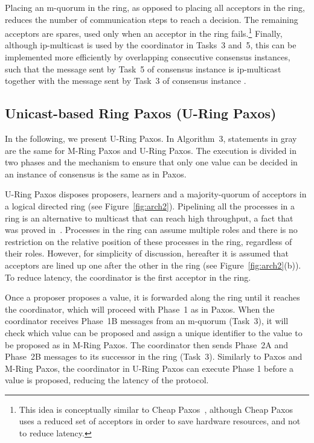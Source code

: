 \documentclass[final,3p,times,twocolumn,authoryear]{elsarticle}
\begin{document}
Placing an m-quorum in the ring, as opposed to placing all acceptors in the ring, reduces the number of communication steps to reach a decision. The remaining acceptors are spares, used only when an acceptor in the ring fails.\footnote{This idea is conceptually similar to Cheap Paxos~\cite{LM04}, although Cheap Paxos uses a reduced set of acceptors in order to save hardware resources, and not to reduce latency.} Finally, although ip-multicast is used by the coordinator in Tasks~3 and~5, this can be implemented more efficiently by overlapping consecutive consensus instances, such that the message sent by Task~5 of consensus instance  is ip-multicast together with the message sent by Task~3 of consensus instance .



\subsection{Unicast-based Ring Paxos (U-Ring Paxos)}
\label{sec:unirpaxos}

In the following, we present U-Ring Paxos. In Algorithm~3, statements in gray are the same for M-Ring Paxos and U-Ring Paxos. The execution is divided in two phases and the mechanism to ensure that only one value can be decided in an instance of consensus is the same as in Paxos.


U-Ring Paxos disposes proposers, learners and a majority-quorum of acceptors in a logical directed ring (see Figure~\ref{fig:arch2}). Pipelining all the processes in a ring is an alternative to multicast that can reach high throughput, a fact that was proved in~\cite{Guerraoui2010}. Processes in the ring can assume multiple roles and there is no restriction on the relative position of these processes in the ring, regardless of their roles. However, for simplicity of discussion, hereafter it is assumed that acceptors are lined up one after the other in the ring (see Figure~\ref{fig:arch2}(b)). To reduce latency, the coordinator is the first acceptor in the ring.

Once a proposer proposes a value, it is forwarded along the ring until it reaches the coordinator, which will proceed with Phase~1 as in Paxos. When the coordinator receives Phase~1B messages from an m-quorum (Task~3), it will check which value can be proposed and assign a unique identifier to the value to be proposed as in M-Ring Paxos. The coordinator then sends Phase~2A and Phase~2B messages to its successor in the ring (Task~3).
Similarly to Paxos and M-Ring Paxos, the coordinator in U-Ring Paxos can execute Phase 1 before a value is proposed, reducing the latency of the protocol.
\end{document}
